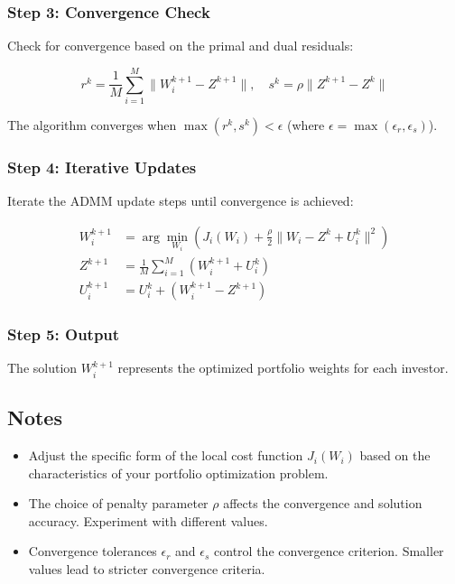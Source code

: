\documentclass{article}
\begin{document}
	\subsubsection*{Step 3: Convergence Check}
	
	Check for convergence based on the primal and dual residuals:
	
	\[
	r^k = \frac{1}{M} \sum_{i=1}^{M} \|W_i^{k+1} - Z^{k+1}\|, \quad s^k = \rho \|Z^{k+1} - Z^k\|
	\]
	
	The algorithm converges when $\max(r^k, s^k) < \epsilon$ (where $\epsilon = \max(\epsilon_r, \epsilon_s)$).
	
	\subsubsection*{Step 4: Iterative Updates}
	
	Iterate the ADMM update steps until convergence is achieved:
	
	\[
	\begin{aligned}
		W_i^{k+1} & = \arg\min_{W_i} \left(J_i(W_i) + \frac{\rho}{2} \|W_i - Z^k + U_i^k\|^2\right) \\
		Z^{k+1} & = \frac{1}{M} \sum_{i=1}^{M} (W_i^{k+1} + U_i^k) \\
		U_i^{k+1} & = U_i^k + (W_i^{k+1} - Z^{k+1})
	\end{aligned}
	\]
	
	\subsubsection*{Step 5: Output}
	
	The solution $W_i^{k+1}$ represents the optimized portfolio weights for each investor.
	
	\subsection*{Notes}
	
	\begin{itemize}
		\item Adjust the specific form of the local cost function $J_i(W_i)$ based on the characteristics of your portfolio optimization problem.
		\item The choice of penalty parameter $\rho$ affects the convergence and solution accuracy. Experiment with different values.
		\item Convergence tolerances $\epsilon_r$ and $\epsilon_s$ control the convergence criterion. Smaller values lead to stricter convergence criteria.
	\end{itemize}
	
\end{document}
